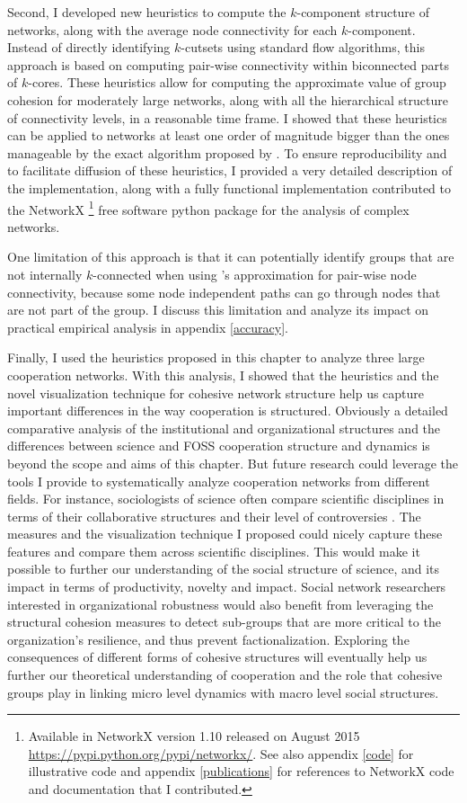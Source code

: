 Second, I developed new heuristics to compute the $k$-component structure of networks, along with the average node connectivity for each $k$-component. Instead of directly identifying $k$-cutsets using standard flow algorithms, this approach is based on computing pair-wise connectivity within biconnected parts of $k$-cores. These heuristics allow for computing the approximate value of group cohesion for moderately large networks, along with all the hierarchical structure of connectivity levels, in a reasonable time frame. I showed that these heuristics can be applied to networks at least one order of magnitude bigger than the ones manageable by the exact algorithm proposed by \citet{moody:2003}. To ensure reproducibility and to facilitate diffusion of these heuristics, I provided a very detailed description of the implementation, along with a fully functional implementation contributed to the NetworkX \footnote{Available in NetworkX version 1.10 released on August 2015 \href{https://pypi.python.org/pypi/networkx/}{https://pypi.python.org/pypi/networkx/}. See also appendix \ref{code} for illustrative code and appendix \ref{publications} for references to NetworkX code and documentation that I contributed.} free software python package for the analysis of complex networks.

One limitation of this approach is that it can potentially identify groups that are not internally $k$-connected when using \citet{white:2001b}'s approximation for pair-wise node connectivity, because some node independent paths can go through nodes that are not part of the group. I discuss this limitation and analyze its impact on practical empirical analysis in appendix \ref{accuracy}.

Finally, I used the heuristics proposed in this chapter to analyze three large cooperation networks. With this analysis, I showed that the heuristics and the novel visualization technique for cohesive network structure help us capture important differences in the way cooperation is structured. Obviously a detailed comparative analysis of the institutional and organizational structures and the differences between science and FOSS cooperation structure and dynamics is beyond the scope and aims of this chapter. But future research could leverage the tools I provide to systematically analyze cooperation networks from different fields. For instance, sociologists of science often compare scientific disciplines in terms of their collaborative structures \citep{moody:2004} and their level of controversies \citep{bearman:2010}. The measures and the visualization technique I proposed could nicely capture these features and compare them across scientific disciplines. This would make it possible to further our understanding of the social structure of science, and its impact in terms of productivity, novelty and impact. Social network researchers interested in organizational robustness would also benefit from leveraging the structural cohesion measures to detect sub-groups that are more critical to the organization's resilience, and thus prevent factionalization. Exploring the consequences of different forms of cohesive structures will eventually help us further our theoretical understanding of cooperation and the role that cohesive groups play in linking micro level dynamics with macro level social structures.
